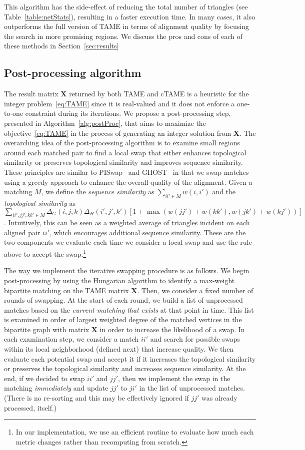 \documentclass[10pt, journal, compsoc, final]{IEEEtran}
\newcommand{\Matrix}[1]{\mathbf{#1}}
\begin{document}
This algorithm has the side-effect of reducing the total number of triangles (see Table~\ref{table:netStats}), 
resulting in a faster execution time. In many cases, 
it also outperforms the full version of TAME in terms of alignment quality by focusing the search
in more promising regions. 
We discuss the pros and cons of each of these methods in Section~\ref{sec:results}


\subsection{Post-processing algorithm}

The result matrix $\Matrix{X}$ returned by both TAME and cTAME is a heuristic for the integer problem~\eqref{eq:TAME} since it is real-valued and it does not enforce a one-to-one constraint during its
iterations. We propose a post-processing step, presented in Algorithm~\ref{alg:postProc}, that aims to maximize the objective~\eqref{eq:TAME} in the process of generating an integer solution from $\Matrix{X}$. The overarching idea of the post-processing algorithm is to examine small regions around each matched pair to find a local swap that either enhances topological similarity or preserves topological similarity and improves sequence similarity. These principles are similar to PISwap~\cite{PISWAP} and GHOST~\cite{GHOST} in that we swap matches using a greedy approach
to enhance the overall quality of the alignment.  Given a matching $M$, we define the \emph{sequence similarity} as $\sum_{ii' \in M} w(i,i')$ and the \emph{topological similarity} as $\sum_{ii', jj', kk' \in M} \Delta_G(i,j,k) \Delta_H(i',j',k') [1+\max(w(jj') + w(kk'), w(jk') + w(kj'))]$. Intuitively, this can be seen as a weighted average of triangles incident on each aligned pair $ii'$, which encourages additional sequence similarity. These are the two components we evaluate each time we consider a local swap and use the rule above to accept the swap.\footnote{In our implementation, we use an efficient routine to evaluate how much each metric changes rather than recomputing from scratch.} 

The way we implement the iterative swapping procedure is as follows. We begin post-processing by using the Hungarian algorithm to identify a max-weight bipartite matching on the TAME matrix $\Matrix{X}$. Then, we consider a fixed number of rounds of swapping. At the start of each round, we build a list of unprocessed matches based on the \emph{current matching that exists} at that point in time. This list is examined in order of largest weighted degree of the matched vertices in the bipartite graph with matrix $\Matrix{X}$ in order to increase the likelihood of a swap.  In each examination step, we consider a match $ii'$ and search for possible swaps within its local neighborhood (defined next) that increase quality. We then evaluate each potential swap and accept it if it increases the topological similarity or preserves the topological similarity and increases sequence similarity. At the end, if we decided to swap $ii'$ and $jj'$, then we implement the swap in the matching \emph{immediately} and update $jj'$ to $ji'$ in the list of unprocessed matches. (There is no re-sorting and this may be effectively  ignored if $jj'$ was already processed, itself.) 
\end{document}
